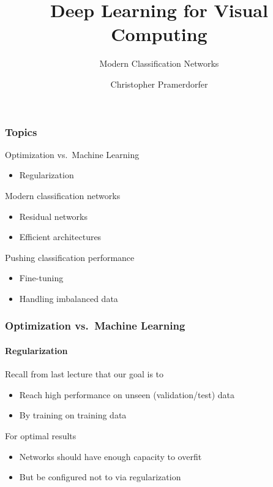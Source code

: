\documentclass[xetex,professionalfont]{beamer}
\title{Deep Learning for Visual Computing}
\subtitle{Modern Classification Networks}
\author{Christopher Pramerdorfer}
\institute{Computer Vision Lab, TU Wien}
\begin{document}
\begin{frame}
	\maketitle
\end{frame}


\begin{frame}
	\frametitle{Topics}

	Optimization vs.~Machine Learning
	\begin{itemize}
		\item Regularization
	\end{itemize}

	\bigskip

	Modern classification networks
	\begin{itemize}
		\item Residual networks
		\item Efficient architectures
	\end{itemize}

	\bigskip

	Pushing classification performance
	\begin{itemize}
		\item Fine-tuning
		\item Handling imbalanced data
	\end{itemize}

\end{frame}


\begin{frame}
	\frametitle{Optimization vs.~Machine Learning}
	\framesubtitle{Regularization}

	Recall from last lecture that our goal is to
	\begin{itemize}
		\item Reach high performance on unseen (validation/test) data
		\item By training on training data
	\end{itemize}

	\bigskip

	For optimal results
	\begin{itemize}
		\item Networks should have enough capacity to overfit
		\item But be configured not to via regularization
	\end{itemize}

\end{frame}
\end{document}
